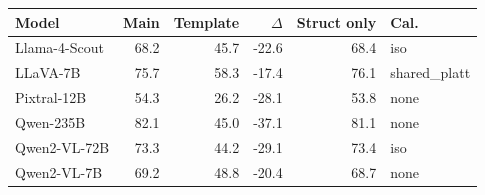 \begin{tabular}{lrrrrl}
\toprule
Model & Main & Template & $\Delta$ & Struct only & Cal. \\
\midrule
Llama-4-Scout & 68.2 & 45.7 & -22.6 & 68.4 & iso \\
LLaVA-7B & 75.7 & 58.3 & -17.4 & 76.1 & shared\_platt \\
Pixtral-12B & 54.3 & 26.2 & -28.1 & 53.8 & none \\
Qwen-235B & 82.1 & 45.0 & -37.1 & 81.1 & none \\
Qwen2-VL-72B & 73.3 & 44.2 & -29.1 & 73.4 & iso \\
Qwen2-VL-7B & 69.2 & 48.8 & -20.4 & 68.7 & none \\
\bottomrule
\end{tabular}
